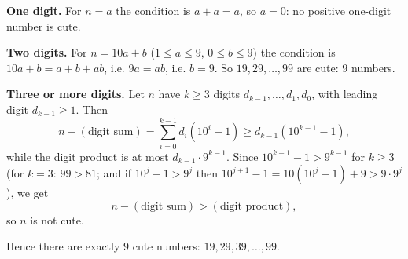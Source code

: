 \textbf{One digit.} For $n=a$ the condition is $a+a=a$, so $a=0$: no positive one-digit number is cute.

\textbf{Two digits.} For $n=10a+b$ ($1\le a\le9$, $0\le b\le9$) the condition is $10a+b=a+b+ab$, i.e. $9a=ab$, i.e. $b=9$. So $19,29,\dots,99$ are cute: $9$ numbers.

\textbf{Three or more digits.} Let $n$ have $k\ge3$ digits $d_{k-1},\dots,d_1,d_0$, with leading digit $d_{k-1}\ge1$. Then
\[n-(\text{digit sum})=\sum_{i=0}^{k-1}d_i\left(10^i-1\right)\ge d_{k-1}\left(10^{k-1}-1\right),\]
while the digit product is at most $d_{k-1}\cdot9^{k-1}$. Since $10^{k-1}-1>9^{k-1}$ for $k\ge3$ (for $k=3$: $99>81$; and if $10^{j}-1>9^{j}$ then $10^{j+1}-1=10\left(10^j-1\right)+9>9\cdot9^j$), we get
\[n-(\text{digit sum})>(\text{digit product}),\]
so $n$ is not cute.

Hence there are exactly $\boxed{9}$ cute numbers: $19,29,39,\dots,99$.
